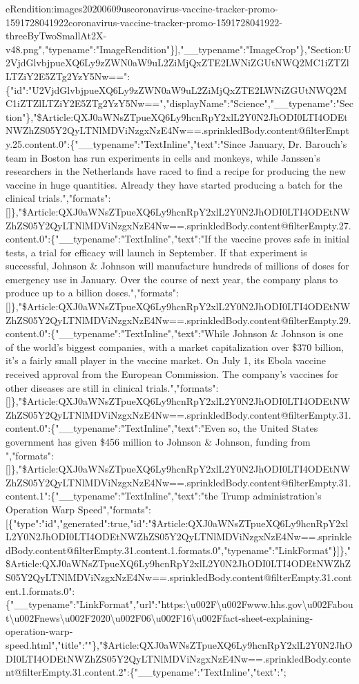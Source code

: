 eRendition:images20200609uscoronavirus-vaccine-tracker-promo-1591728041922coronavirus-vaccine-tracker-promo-1591728041922-threeByTwoSmallAt2X-v48.png","typename":"ImageRendition"\}{]},"\_\_typename":"ImageCrop"\},"Section:U2VjdGlvbjpueXQ6Ly9zZWN0aW9uL2ZiMjQxZTE2LWNiZGUtNWQ2MC1iZTZlLTZiY2E5ZTg2YzY5Nw==":\{"id":"U2VjdGlvbjpueXQ6Ly9zZWN0aW9uL2ZiMjQxZTE2LWNiZGUtNWQ2MC1iZTZlLTZiY2E5ZTg2YzY5Nw==","displayName":"Science","\_\_typename":"Section"\},"\$Article:QXJ0aWNsZTpueXQ6Ly9hcnRpY2xlL2Y0N2JhODI0LTI4ODEtNWZhZS05Y2QyLTNlMDViNzgxNzE4Nw==.sprinkledBody.content@filterEmpty.25.content.0":\{"\_\_typename":"TextInline","text":"Since
January, Dr. Barouch's team in Boston has run experiments in cells and
monkeys, while Janssen's researchers in the Netherlands have raced to
find a recipe for producing the new vaccine in huge quantities. Already
they have started producing a batch for the clinical
trials.","formats":{[}{]}\},"\$Article:QXJ0aWNsZTpueXQ6Ly9hcnRpY2xlL2Y0N2JhODI0LTI4ODEtNWZhZS05Y2QyLTNlMDViNzgxNzE4Nw==.sprinkledBody.content@filterEmpty.27.content.0":\{"\_\_typename":"TextInline","text":"If
the vaccine proves safe in initial tests, a trial for efficacy will
launch in September. If that experiment is successful, Johnson \&
Johnson will manufacture hundreds of millions of doses for emergency use
in January. Over the course of next year, the company plans to produce
up to a billion
doses.","formats":{[}{]}\},"\$Article:QXJ0aWNsZTpueXQ6Ly9hcnRpY2xlL2Y0N2JhODI0LTI4ODEtNWZhZS05Y2QyLTNlMDViNzgxNzE4Nw==.sprinkledBody.content@filterEmpty.29.content.0":\{"\_\_typename":"TextInline","text":"While
Johnson \& Johnson is one of the world's biggest companies, with a
market capitalization over \$370 billion, it's a fairly small player in
the vaccine market. On July 1, its Ebola vaccine received approval from
the European Commission. The company's vaccines for other diseases are
still in clinical
trials.","formats":{[}{]}\},"\$Article:QXJ0aWNsZTpueXQ6Ly9hcnRpY2xlL2Y0N2JhODI0LTI4ODEtNWZhZS05Y2QyLTNlMDViNzgxNzE4Nw==.sprinkledBody.content@filterEmpty.31.content.0":\{"\_\_typename":"TextInline","text":"Even
so, the United States government has given \$456 million to Johnson \&
Johnson, funding from
","formats":{[}{]}\},"\$Article:QXJ0aWNsZTpueXQ6Ly9hcnRpY2xlL2Y0N2JhODI0LTI4ODEtNWZhZS05Y2QyLTNlMDViNzgxNzE4Nw==.sprinkledBody.content@filterEmpty.31.content.1":\{"\_\_typename":"TextInline","text":"the
Trump administration's Operation Warp
Speed","formats":{[}\{"type":"id","generated":true,"id":"\$Article:QXJ0aWNsZTpueXQ6Ly9hcnRpY2xlL2Y0N2JhODI0LTI4ODEtNWZhZS05Y2QyLTNlMDViNzgxNzE4Nw==.sprinkledBody.content@filterEmpty.31.content.1.formats.0","typename":"LinkFormat"\}{]}\},"\$Article:QXJ0aWNsZTpueXQ6Ly9hcnRpY2xlL2Y0N2JhODI0LTI4ODEtNWZhZS05Y2QyLTNlMDViNzgxNzE4Nw==.sprinkledBody.content@filterEmpty.31.content.1.formats.0":\{"\_\_typename":"LinkFormat","url":"https:\textbackslash{}u002F\textbackslash{}u002Fwww.hhs.gov\textbackslash{}u002Fabout\textbackslash{}u002Fnews\textbackslash{}u002F2020\textbackslash{}u002F06\textbackslash{}u002F16\textbackslash{}u002Ffact-sheet-explaining-operation-warp-speed.html","title":""\},"\$Article:QXJ0aWNsZTpueXQ6Ly9hcnRpY2xlL2Y0N2JhODI0LTI4ODEtNWZhZS05Y2QyLTNlMDViNzgxNzE4Nw==.sprinkledBody.content@filterEmpty.31.content.2":\{"\_\_typename":"TextInline","text":";
